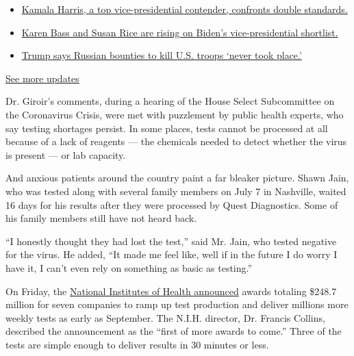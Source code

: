 \begin{itemize}
\tightlist
\item
  \href{https://www.nytimes.com/2020/07/31/us/elections/biden-vs-trump.html?action=click\&pgtype=Article\&state=default\&region=MAIN_CONTENT_1\&context=storylines_live_updates\#link-29fdff45}{Kamala
  Harris, a top vice-presidential contender, confronts double
  standards.}
\item
  \href{https://www.nytimes.com/2020/07/31/us/elections/biden-vs-trump.html?action=click\&pgtype=Article\&state=default\&region=MAIN_CONTENT_1\&context=storylines_live_updates\#link-13ec3d9c}{Karen
  Bass and Susan Rice are rising on Biden's vice-presidential
  shortlist.}
\item
  \href{https://www.nytimes.com/2020/07/31/us/elections/biden-vs-trump.html?action=click\&pgtype=Article\&state=default\&region=MAIN_CONTENT_1\&context=storylines_live_updates\#link-49e9a016}{Trump
  says Russian bounties to kill U.S. troops `never took place.'}
\end{itemize}

\href{https://www.nytimes.com/2020/07/31/us/elections/biden-vs-trump.html?action=click\&pgtype=Article\&state=default\&region=MAIN_CONTENT_1\&context=storylines_live_updates}{See
more updates}

Dr. Giroir's comments, during a hearing of the House Select Subcommittee
on the Coronavirus Crisis, were met with puzzlement by public health
experts, who say testing shortages persist. In some places, tests cannot
be processed at all because of a lack of reagents --- the chemicals
needed to detect whether the virus is present --- or lab capacity.

And anxious patients around the country paint a far bleaker picture.
Shawn Jain, who was tested along with several family members on July 7
in Nashville, waited 16 days for his results after they were processed
by Quest Diagnostics. Some of his family members still have not heard
back.

``I honestly thought they had lost the test,'' said Mr. Jain, who tested
negative for the virus. He added, ``It made me feel like, well if in the
future I do worry I have it, I can't even rely on something as basic as
testing.''

On Friday, the
\href{https://www.nih.gov/news-events/news-releases/nih-delivering-new-covid-19-testing-technologies-meet-us-demand}{National
Institutes of Health announced} awards totaling \$248.7 million for
seven companies to ramp up test production and deliver millions more
weekly tests as early as September. The N.I.H. director, Dr. Francis
Collins, described the announcement as the ``first of more awards to
come.'' Three of the tests are simple enough to deliver results in 30
minutes or less.

